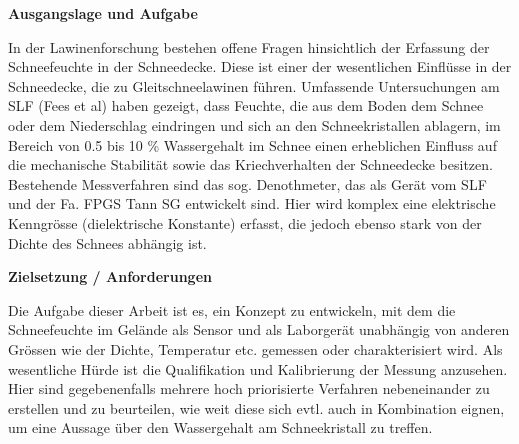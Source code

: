 


\textbf{Ausgangslage und Aufgabe}

In der Lawinenforschung bestehen offene Fragen hinsichtlich der Erfassung der Schneefeuchte in der Schneedecke. Diese ist einer der wesentlichen Einflüsse in der Schneedecke, die zu Gleitschneelawinen führen. Umfassende Untersuchungen am SLF (Fees et al) haben gezeigt, dass Feuchte, die aus dem Boden dem Schnee oder dem Niederschlag eindringen und sich an den Schneekristallen ablagern, im Bereich von 0.5 bis 10 \% Wassergehalt im Schnee einen erheblichen Einfluss auf die mechanische Stabilität sowie das Kriechverhalten der Schneedecke besitzen.
Bestehende Messverfahren sind das sog. Denothmeter, das als Gerät vom SLF und der Fa. FPGS Tann SG entwickelt sind. Hier wird komplex eine elektrische Kenngrösse (dielektrische Konstante) erfasst, die jedoch ebenso stark von der Dichte des Schnees abhängig ist.



\textbf{Zielsetzung / Anforderungen}

Die Aufgabe dieser Arbeit ist es, ein Konzept zu entwickeln, mit dem die Schneefeuchte im Gelände als Sensor und als Laborgerät unabhängig von anderen Grössen wie der Dichte, Temperatur etc. gemessen oder charakterisiert wird. Als wesentliche Hürde ist die Qualifikation und Kalibrierung der Messung anzusehen. Hier sind gegebenenfalls mehrere hoch priorisierte Verfahren nebeneinander zu erstellen und zu beurteilen, wie weit diese sich evtl. auch in Kombination eignen, um eine Aussage über den Wassergehalt am Schneekristall zu treffen.




